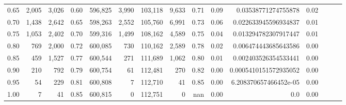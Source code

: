 \begin{tabular}{rrrrrrrrrrrrrrr}
0.65 &    2,005 &   3,026 &  0.60 &  596,825 &    3,990 &  103,118 &    9,633 &  0.71 &  0.09 &    0.03538771274755878 &      0.02 \\
0.70 &    1,438 &   2,642 &  0.65 &  598,263 &    2,552 &  105,760 &    6,991 &  0.73 &  0.06 &   0.022633945596934837 &      0.01 \\
0.75 &    1,053 &   2,402 &  0.70 &  599,316 &    1,499 &  108,162 &    4,589 &  0.75 &  0.04 &   0.013294782307917447 &      0.01 \\
0.80 &      769 &   2,000 &  0.72 &  600,085 &      730 &  110,162 &    2,589 &  0.78 &  0.02 &   0.006474443685643586 &      0.00 \\
0.85 &      459 &   1,527 &  0.77 &  600,544 &      271 &  111,689 &    1,062 &  0.80 &  0.01 &   0.002403526354533441 &      0.00 \\
0.90 &      210 &     792 &  0.79 &  600,754 &       61 &  112,481 &      270 &  0.82 &  0.00 &  0.0005410151572935052 &      0.00 \\
0.95 &       54 &     229 &  0.81 &  600,808 &        7 &  112,710 &       41 &  0.85 &  0.00 &  6.208370657466452e-05 &      0.00 \\
1.00 &        7 &      41 &  0.85 &  600,815 &        0 &  112,751 &        0 &   nan &  0.00 &                    0.0 &      0.00 \\
\bottomrule
\end{tabular}
